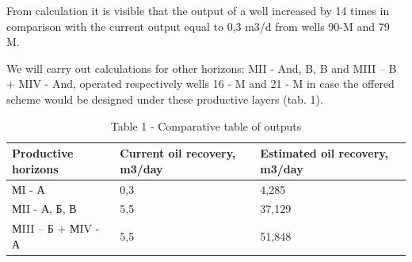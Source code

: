\begin{multicols}{2}
From calculation it is visible that the output of a well increased by 14
times in comparison with the current output equal to 0,3 m3/d from wells 90-M and
79 M.

We will carry out calculations for other horizons: MII - And, B, B and
MIII -- B + MIV - And, operated respectively wells 16 - M and 21 - M in
case the offered scheme would be designed under these productive layers
(tab. 1).
\end{multicols}

\begin{table}[H]
\caption*{Table 1 - Comparative table of outputs}
\centering
\begin{tabular}{|l|l|l|}
\hline
Productive horizons & Current oil recovery, m3/day & Estimated oil recovery, m3/day \\ \hline
МI - А & 0,3 & 4,285 \\ \hline
МII - А, Б, В & 5,5 & 37,129 \\ \hline
МIII – Б + МIV - А & 5,5 & 51,848 \\ \hline
\end{tabular}
\end{table}

